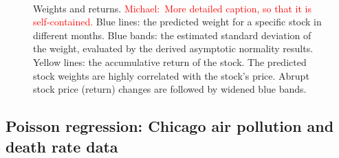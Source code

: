 \documentclass[aos]{imsart}
\numberwithin{equation}{section}
\theoremstyle{plain}
\newcommand{\michael}[1]{\textcolor{red}{Michael:\ #1}}
\begin{document}
\begin{figure}[ht]
{    }\
    \
    \caption{		
             Weights and returns. \michael{More detailed caption, so that it is self-contained.} Blue lines: the predicted weight for a specific stock in different months. Blue bands: the estimated standard deviation of the weight, evaluated by the derived asymptotic normality results. Yellow lines: the accumulative return of the stock. The predicted stock weights are highly correlated with the stock's price. Abrupt stock price (return) changes are followed by widened blue bands.
            }	
    \label{fig:portfolio}
\end{figure}




\subsection{Poisson regression: Chicago air pollution and death rate data}
\label{sec:poisson_regression}
\end{document}
